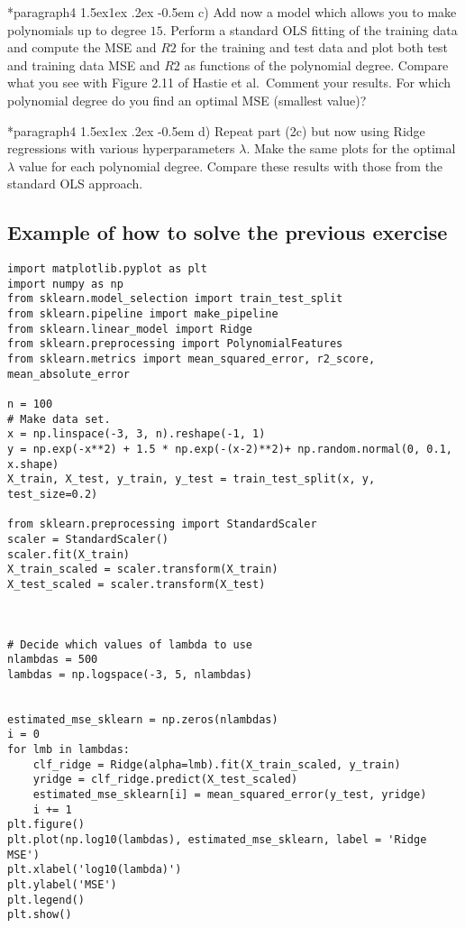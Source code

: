 \documentclass[%
oneside,                 %
final,                   %
10pt]{article}
\makeatletter
\newenvironment{doconceexercise}{}{}
\newcommand\subex{\@startsection*{paragraph}{4}{\z@}%
                  {1.5ex\@plus1ex \@minus.2ex}%
                  {-0.5em}%
                  {\normalfont\normalsize\bfseries}}
\makeatother
\begin{document}
\begin{doconceexercise}
\subex{c)}
Add now a model which allows you to make polynomials up to degree $15$.  Perform a standard OLS fitting of the training data and compute the MSE and $R2$ for the training and test data and plot both test and training data MSE and $R2$ as functions of the polynomial degree. Compare what you see with Figure 2.11 of Hastie et al.~Comment your results. For which polynomial degree do you find an optimal MSE (smallest value)?

\subex{d)}
Repeat part (2c) but now using Ridge regressions with various hyperparameters $\lambda$. Make the same plots for the optimal $\lambda$ value for each polynomial degree. Compare these results with those from the standard OLS approach.






\end{doconceexercise}


\subsection*{Example of how to solve the previous exercise}

\begin{verbatim}
import matplotlib.pyplot as plt
import numpy as np
from sklearn.model_selection import train_test_split
from sklearn.pipeline import make_pipeline
from sklearn.linear_model import Ridge
from sklearn.preprocessing import PolynomialFeatures
from sklearn.metrics import mean_squared_error, r2_score, mean_absolute_error

n = 100
# Make data set.
x = np.linspace(-3, 3, n).reshape(-1, 1)
y = np.exp(-x**2) + 1.5 * np.exp(-(x-2)**2)+ np.random.normal(0, 0.1, x.shape)
X_train, X_test, y_train, y_test = train_test_split(x, y, test_size=0.2)

from sklearn.preprocessing import StandardScaler
scaler = StandardScaler()
scaler.fit(X_train)
X_train_scaled = scaler.transform(X_train)
X_test_scaled = scaler.transform(X_test)



# Decide which values of lambda to use
nlambdas = 500
lambdas = np.logspace(-3, 5, nlambdas)


estimated_mse_sklearn = np.zeros(nlambdas)
i = 0
for lmb in lambdas:
    clf_ridge = Ridge(alpha=lmb).fit(X_train_scaled, y_train)
    yridge = clf_ridge.predict(X_test_scaled)
    estimated_mse_sklearn[i] = mean_squared_error(y_test, yridge)
    i += 1
plt.figure()
plt.plot(np.log10(lambdas), estimated_mse_sklearn, label = 'Ridge MSE')
plt.xlabel('log10(lambda)')
plt.ylabel('MSE')
plt.legend()
plt.show()

\end{verbatim}
\end{document}
